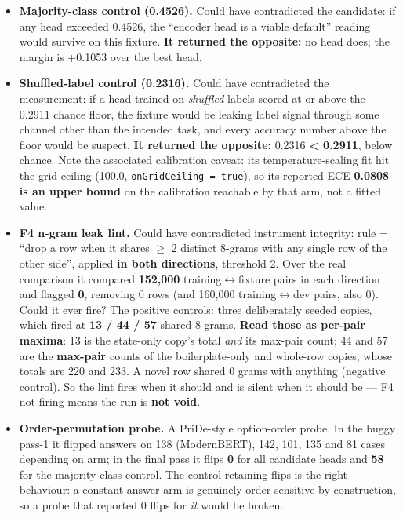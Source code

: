 \documentclass[11pt,a4paper]{article}
\begin{document}
\begin{itemize}
\item \textbf{Majority-class control (0.4526).} Could have contradicted the candidate: if any head exceeded 0.4526, the ``encoder head is a viable default'' reading would survive on this fixture. \textbf{It returned the opposite:} no head does; the margin is +0.1053 over the best head.
\item \textbf{Shuffled-label control (0.2316).} Could have contradicted the measurement: if a head trained on \emph{shuffled} labels scored at or above the 0.2911 chance floor, the fixture would be leaking label signal through some channel other than the intended task, and every accuracy number above the floor would be suspect. \textbf{It returned the opposite:} 0.2316 \textbf{< 0.2911}, below chance. Note the associated calibration caveat: its temperature-scaling fit hit the grid ceiling (100.0, \texttt{onGridCeiling = true}), so its reported ECE \textbf{0.0808 is an upper bound} on the calibration reachable by that arm, not a fitted value.
\item \textbf{F4 n-gram leak lint.} Could have contradicted instrument integrity: rule = ``drop a row when it shares $\ge$ 2 distinct 8-grams with any single row of the other side'', applied \textbf{in both directions}, threshold 2. Over the real comparison it compared \textbf{152,000} training$\leftrightarrow$fixture pairs in each direction and flagged \textbf{0}, removing 0 rows (and 160,000 training$\leftrightarrow$dev pairs, also 0). Could it ever fire? The positive controls: three deliberately seeded copies, which fired at \textbf{13 / 44 / 57} shared 8-grams. \textbf{Read those as per-pair maxima}: 13 is the state-only copy's total \emph{and} its max-pair count; 44 and 57 are the \textbf{max-pair} counts of the boilerplate-only and whole-row copies, whose totals are 220 and 233. A novel row shared 0 grams with anything (negative control). So the lint fires when it should and is silent when it should be --- F4 not firing means the run is \textbf{not void}.
\item \textbf{Order-permutation probe.} A PriDe-style option-order probe. In the buggy pass-1 it flipped answers on 138 (ModernBERT), 142, 101, 135 and 81 cases depending on arm; in the final pass it flips \textbf{0} for all candidate heads and \textbf{58} for the majority-class control. The control retaining flips is the right behaviour: a constant-answer arm is genuinely order-sensitive by construction, so a probe that reported 0 flips for \emph{it} would be broken.

\end{itemize}
\end{document}
